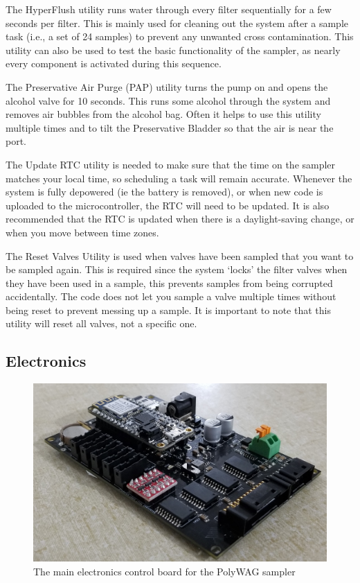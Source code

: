 \documentclass[11pt, letterpaper]{article}
\begin{document}
The HyperFlush utility runs water through every filter sequentially for a few seconds per filter. This is mainly used for cleaning out the system after a sample task (i.e., a set of 24 samples) to prevent any unwanted cross contamination. This utility can also be used to test the basic functionality of the sampler, as nearly every component is activated during this sequence. 
\newline\par\noindent
The Preservative Air Purge (PAP) utility turns the pump on and opens the alcohol valve for 10 seconds. This runs some alcohol through the system and removes air bubbles from the alcohol bag. Often it helps to use this utility multiple times and to tilt the Preservative Bladder so that the air is near the port.
\newline\par\noindent
The Update RTC utility is needed to make sure that the time on the sampler matches your local time, so scheduling a task will remain accurate. Whenever the system is fully depowered (ie the battery is removed), or when new code is uploaded to the microcontroller, the RTC will need to be updated. It is also recommended that the RTC is updated when there is a daylight-saving change, or when you move between time zones.
\newline\par\noindent
The Reset Valves Utility is used when valves have been sampled that you want to be sampled again. This is required since the system ‘locks’ the filter valves when they have been used in a sample, this prevents samples from being corrupted accidentally. The code does not let you sample a valve multiple times without being reset to prevent messing up a sample. It is important to note that this utility will reset all valves, not a specific one.

\subsection{Electronics}
\label{subsec:Elec}
\begin{figure}[H]
	\centering
	\includegraphics[scale=0.15]{./Assets/eDNABoard.jpg}
	\caption{The main electronics control board for the PolyWAG sampler}
\end{figure}
\end{document}
